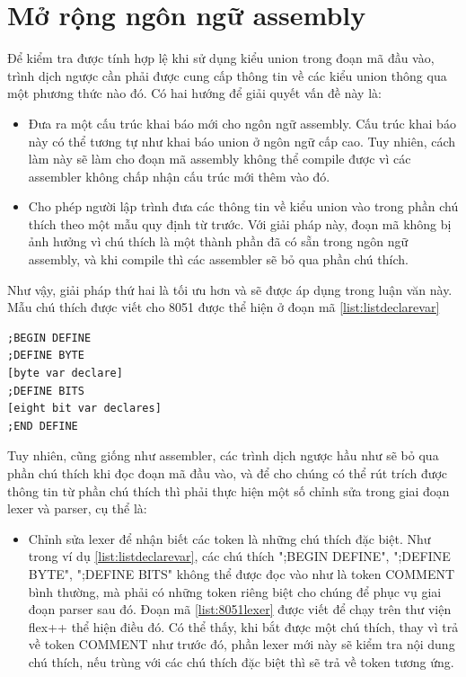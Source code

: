 \section{Mở rộng ngôn ngữ assembly}
Để kiểm tra được tính hợp lệ khi sử dụng kiểu union trong đoạn mã đầu vào, trình dịch ngược cần phải được cung cấp thông tin về các kiểu union thông qua một phương thức nào đó. Có hai hướng để giải quyết vấn đề này là:
\begin{itemize}
	\item Đưa ra một cấu trúc khai báo mới cho ngôn ngữ assembly. Cấu trúc khai báo này có thể tương tự như khai báo union ở ngôn ngữ cấp cao. Tuy nhiên, cách làm này sẽ làm cho đoạn mã assembly không thể compile được vì các assembler không chấp nhận cấu trúc mới thêm vào đó.
	\item Cho phép người lập trình đưa các thông tin về kiểu union vào trong phần chú thích theo một mẫu quy định từ trước. Với giải pháp này, đoạn mã không bị ảnh hưởng vì chú thích là một thành phần đã có sẵn trong ngôn ngữ assembly, và khi compile thì các assembler sẽ bỏ qua phần chú thích.
\end{itemize}
Như vậy, giải pháp thứ hai là tối ưu hơn và sẽ được áp dụng trong luận văn này. Mẫu chú thích được viết cho 8051 được thể hiện ở đoạn mã \ref{list:listdeclarevar}
\begin{lstlisting}[caption={Mẫu khai báo bộ biến},label={list:listdeclarevar}]
;BEGIN DEFINE
;DEFINE BYTE
[byte var declare]
;DEFINE BITS
[eight bit var declares]
;END DEFINE
\end{lstlisting}
Tuy nhiên, cũng giống như assembler, các trình dịch ngược hầu như sẽ bỏ qua phần chú thích khi đọc đoạn mã đầu vào, và để cho chúng có thể rút trích được thông tin từ phần chú thích thì phải thực hiện một số chỉnh sửa trong giai đoạn lexer và parser, cụ thể là:
\begin{itemize}
	\item Chỉnh sửa lexer để nhận biết các token là những chú thích đặc biệt. Như trong ví dụ \ref{list:listdeclarevar}, các chú thích ";BEGIN DEFINE", ";DEFINE BYTE", ";DEFINE BITS" không thể được đọc vào như là token COMMENT bình thường, mà phải có những token riêng biệt cho chúng để phục vụ giai đoạn parser sau đó. Đoạn mã \ref{list:8051lexer} được viết để chạy trên thư viện flex++ thể hiện điều đó. Có thể thấy, khi bắt được một chú thích, thay vì trả về token COMMENT như trước đó, phần lexer mới này sẽ kiểm tra nội dung chú thích, nếu trùng với các chú thích đặc biệt thì sẽ trả về token tương ứng. 
\end{itemize}

